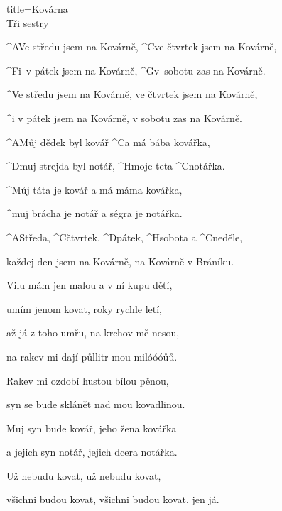 \begin{song}{title=\predtitle\predtitle\centering Kovárna \\\large Tři sestry \vspace*{-0.3cm}}  %
\begin{centerjustified}
\nejvetsi

\sloka 
	^{A}Ve středu jsem na Kovárně, ^{C}ve čtvrtek jsem na Kovárně,

	^{F\z}i~v pátek jsem na Kovárně, ^{G\z}v~sobotu zas na Kovárně.
	
	^{\phantom{.}}Ve středu jsem na Kovárně, ve čtvrtek jsem na Kovárně,
	
	^{\phantom{.}}i v pátek jsem na Kovárně, v sobotu zas na Kovárně.

\sloka
	^{A}Můj dědek byl kovář ^{C}a má bába kovářka,

	^{D}muj strejda byl notář, ^{H}moje teta ^{C}notářka.
	
	^{\phantom{.}}Můj táta je kovář a má máma kovářka,
	
	^{\phantom{.}}muj brácha je notář a ségra je notářka.

	^{A}Středa, ^{C}čtvrtek, ^{D}pátek, ^{H}sobota a ^{C}neděle, 
	
	každej den jsem na Kovárně,	na Kovárně v Bráníku.

\sloka
	Vilu mám jen malou a v ní kupu dětí,
	
	umím jenom kovat, roky rychle letí,
	
	až já z toho umřu, na krchov mě nesou,
	
	na rakev mi dají půllitr mou milóóóůů.


\sloka
	Rakev mi ozdobí hustou bílou pěnou,
	
	syn se bude sklánět nad mou kovadlinou.
	
	Muj syn bude kovář, jeho žena kovářka
	
	a jejich syn notář, jejich dcera notářka.
	
	Už nebudu kovat, už nebudu kovat,
	
	všichni budou kovat, všichni budou kovat, jen já.


\end{centerjustified}
\setcounter{Slokočet}{0}
\end{song}
